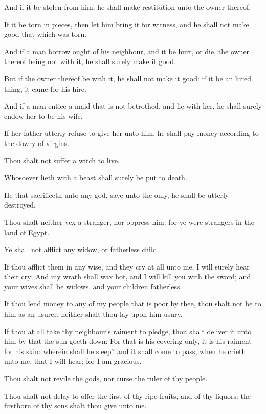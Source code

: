 \verse And if it be stolen from him, he shall make restitution unto the
owner thereof.

\verse If it be torn in pieces, then let him bring it for witness, and
he shall not make good that which was torn.

\verse And if a man borrow ought of his neighbour, and it be hurt, or
die, the owner thereof being not with it, he shall surely make it
good.

\verse But if the owner thereof be with it, he shall not make it good:
if it be an hired thing, it came for his hire.

\verse And if a man entice a maid that is not betrothed, and lie with
her, he shall surely endow her to be his wife.

\verse If her father utterly refuse to give her unto him, he shall pay
money according to the dowry of virgins.

\verse Thou shalt not suffer a witch to live.

\verse Whosoever lieth with a beast shall surely be put to death.

\verse He that sacrificeth unto any god, save unto the \LORD only, he
shall be utterly destroyed.

\verse Thou shalt neither vex a stranger, nor oppress him: for ye were
strangers in the land of Egypt.

\verse Ye shall not afflict any widow, or fatherless child.

\verse If thou afflict them in any wise, and they cry at all unto me, I
will surely hear their cry; \verse And my wrath shall wax hot, and I
will kill you with the sword; and your wives shall be widows, and your
children fatherless.

\verse If thou lend money to any of my people that is poor by thee,
thou shalt not be to him as an usurer, neither shalt thou lay upon him
usury.

\verse If thou at all take thy neighbour's raiment to pledge, thou
shalt deliver it unto him by that the sun goeth down: \verse For that
is his covering only, it is his raiment for his skin: wherein shall he
sleep? and it shall come to pass, when he crieth unto me, that I will
hear; for I am gracious.

\verse Thou shalt not revile the gods, nor curse the ruler of thy
people.

\verse Thou shalt not delay to offer the first of thy ripe fruits, and
of thy liquors: the firstborn of thy sons shalt thou give unto me.

